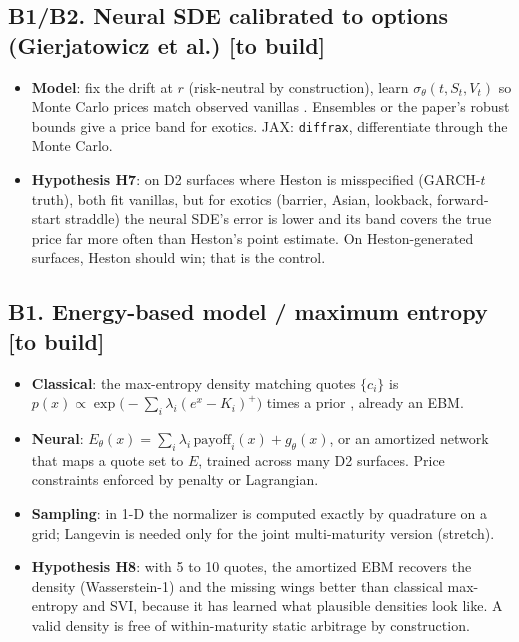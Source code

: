 \documentclass[10pt]{article}
\newcommand{\status}[1]{\textsf{\small[#1]}}
\begin{document}
\subsection{B1/B2. Neural SDE calibrated to options (Gierjatowicz et al.) \status{to build}}
\begin{itemize}
\item \textbf{Model}: fix the drift at $r$ (risk-neutral by construction), learn $\sigma_\theta(t,S_t,V_t)$ so
Monte Carlo prices match observed vanillas \cite{neuralsde}. Ensembles or the paper's robust bounds give a price
band for exotics. JAX: \texttt{diffrax}, differentiate through the Monte Carlo.
\item \textbf{Hypothesis H7}: on D2 surfaces where Heston is misspecified (GARCH-$t$ truth), both fit vanillas, but
for exotics (barrier, Asian, lookback, forward-start straddle) the neural SDE's error is lower and its band covers
the true price far more often than Heston's point estimate. On Heston-generated surfaces, Heston should win; that
is the control.
\end{itemize}

\subsection{B1. Energy-based model / maximum entropy \status{to build}}
\begin{itemize}
\item \textbf{Classical}: the max-entropy density matching quotes $\{c_i\}$ is
$p(x)\propto\exp\!\big(-\sum_i\lambda_i (e^x-K_i)^+\big)$ times a prior \cite{buchenkelly}, already an EBM.
\item \textbf{Neural}: $E_\theta(x)=\sum_i\lambda_i\,\text{payoff}_i(x)+g_\theta(x)$, or an amortized network that
maps a quote set to $E$, trained across many D2 surfaces. Price constraints enforced by penalty or Lagrangian.
\item \textbf{Sampling}: in 1-D the normalizer is computed exactly by quadrature on a grid; Langevin is needed only
for the joint multi-maturity version (stretch).
\item \textbf{Hypothesis H8}: with 5 to 10 quotes, the amortized EBM recovers the density (Wasserstein-1) and the
missing wings better than classical max-entropy and SVI, because it has learned what plausible densities look
like. A valid density is free of within-maturity static arbitrage by construction.
\end{itemize}
\end{document}

